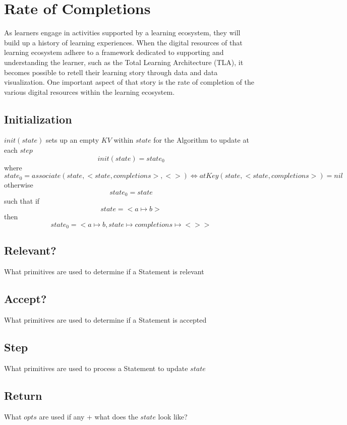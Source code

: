 \documentclass[../main.tex]{subfiles}
\begin{document}
\section{Rate of Completions}
As learners engage in activities supported by a learning ecosystem, they will build
up a history of learning experiences. When the digital resources of that learning ecosystem
adhere to a framework dedicated to supporting and understanding the
learner, such as the Total Learning Architecture (TLA), it becomes
possible to retell their learning story through data and data visualization. One important aspect of
that story is the rate of completion of the various digital resources within the learning ecosystem.

\subsection{Initialization}
$init(state)$ sets up an empty $KV$ within $state$ for the Algorithm to update at each $step$
$$init(state) = state_{0}$$
where
$$state_{0} = associate(state, <state, completions>, <>) \iff atKey(state, <state, completions>) = nil$$
otherwise
$$state_{0} = state$$
such that if
$$state = <a \mapsto b>$$
then
$$state_{0} = <a \mapsto b, state \mapsto completions \mapsto <>>$$

\subsection{Relevant?}
What primitives are used to determine if a Statement is relevant
\subsection{Accept?}
What primitives are used to determine if a Statement is accepted
\subsection{Step}
What primitives are used to process a Statement to update $state$
\subsection{Return}
What $opts$ are used if any + what does the $state$ look like?
\end{document}
